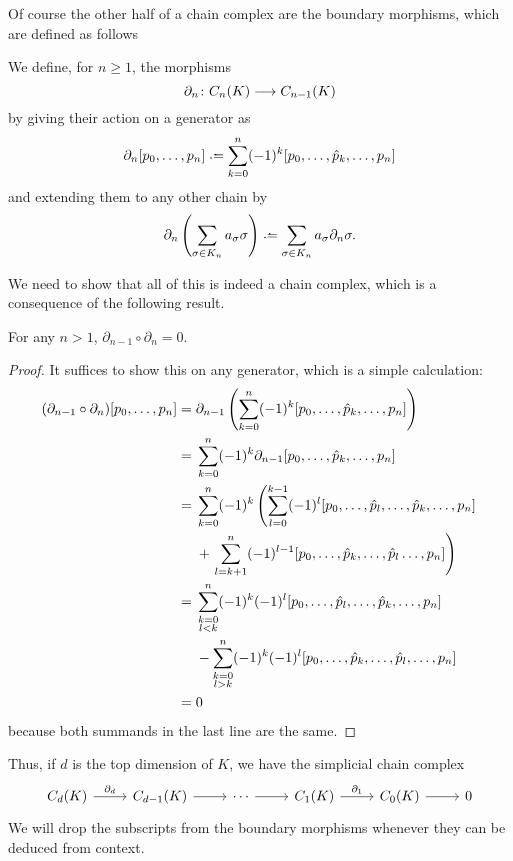 \documentclass[../main.tex]{subfiles}
\begin{document}
Of course the other half of a chain complex are the boundary morphisms, which are defined
as follows
\begin{definition}
	We define, for \( n \geq 1 \), the morphisms
	\begin{equation*}
		\partial_n \colon C_n(K) \longrightarrow C_{n-1}(K)
	\end{equation*}
	by giving their action on a generator as
	\begin{equation*}
		\partial_n [p_0, \dots, p_n] \defeq \sum_{k = 0}^{n} (-1)^k [p_0, \dots, \hat p_k,
		\dots, p_n]
	\end{equation*}
	and extending them to any other chain by
	\begin{equation*}
		\partial_n\left(\sum_{\sigma \in K_n} a_\sigma \sigma\right) \defeq \sum_{\sigma \in K_n}
		a_\sigma \partial_n \sigma.
	\end{equation*}
\end{definition}
We need to show that all of this is indeed a chain complex, which is a consequence of the
following result.
\begin{lemma}
		For any \( n > 1 \), \( \partial_{n-1} \circ \partial_n = 0 \). 
\end{lemma}
\begin{proof}
	It suffices to show this on any generator, which is a simple calculation:
	\begin{align*}
		(\partial_{n-1} \circ \partial_n)[p_0, \dots, p_n] = {} & \partial_{n-1}\left(\sum_{k
		=		0}^{n}(-1)^k[p_0, \dots, \hat p_k, \dots, p_n]\right) \\
				= {} & \sum_{k = 0}^{n}(-1)^k	\partial_{n-1}[p_0, \dots, \hat	p_k, \dots, p_n] \\
				= {} & \sum_{k = 0}^{n}(-1)^k	\left(\sum_{l = 0}^{k - 1} (-1)^l [p_0, \dots, \hat	p_l, \dots, \hat p_k, \dots, p_n] \right. \\
						 & {} + \left. \sum_{l = k+1}^{n}(-1)^{l-1} [p_0, \dots, \hat p_k, \dots, \hat
						 p_l \dots, p_n]\right) \\
				= {} & \sum_{\mathclap{\substack{k = 0 \\ l < k}}}^n (-1)^k(-1)^l [p_0,	\dots,
				\hat p_l, \dots, \hat p_k, \dots, p_n] \\
						 & {} - \sum_{\mathclap{\substack{k = 0 \\ l > k}}}^n (-1)^k(-1)^l [p_0,
						 \dots, \hat p_k, \dots, \hat p_l, \dots, p_n] \\
				= {} & 0
	\end{align*}
	because both summands in the last line are the same. 
\end{proof}
Thus, if \( d \) is the top dimension of \( K \), we have the
simplicial chain complex
\begin{equation*}
	\begin{tikzcd}
		C_d(K) \arrow[r, "\partial_d"] & C_{d-1}(K) \arrow[r] & \cdots \arrow[r] & C_1(K)
		\arrow[r, "\partial_1"] & C_0(K) \arrow[r] & 0 
	\end{tikzcd}
\end{equation*}
We will drop the subscripts from the boundary morphisms whenever they can be deduced from
context. 
\end{document}
